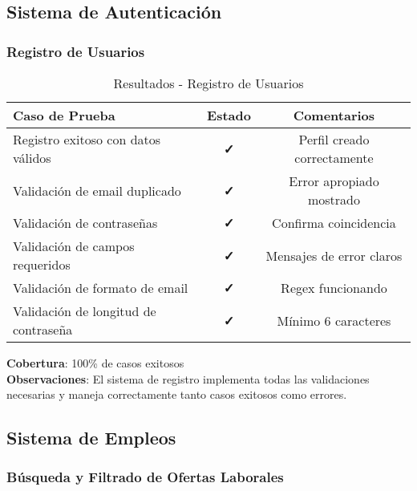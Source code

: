 \documentclass[12pt,a4paper]{article}
\begin{document}
\subsection{Sistema de Autenticación}

\subsubsection{Registro de Usuarios}

\begin{table}[H]
\centering
\caption{Resultados - Registro de Usuarios}
\begin{tabular}{@{}p{6cm}cc@{}}
\toprule
\textbf{Caso de Prueba} & \textbf{Estado} & \textbf{Comentarios} \\
\midrule
Registro exitoso con datos válidos & \textcolor{successgreen}{\textbf{✓}} & Perfil creado correctamente \\
Validación de email duplicado & \textcolor{successgreen}{\textbf{✓}} & Error apropiado mostrado \\
Validación de contraseñas & \textcolor{successgreen}{\textbf{✓}} & Confirma coincidencia \\
Validación de campos requeridos & \textcolor{successgreen}{\textbf{✓}} & Mensajes de error claros \\
Validación de formato de email & \textcolor{successgreen}{\textbf{✓}} & Regex funcionando \\
Validación de longitud de contraseña & \textcolor{successgreen}{\textbf{✓}} & Mínimo 6 caracteres \\
\bottomrule
\end{tabular}
\end{table}

\textbf{Cobertura}: 100\% de casos exitosos \\
\textbf{Observaciones}: El sistema de registro implementa todas las validaciones necesarias y maneja correctamente tanto casos exitosos como errores.

\subsection{Sistema de Empleos}

\subsubsection{Búsqueda y Filtrado de Ofertas Laborales}
\end{document}
